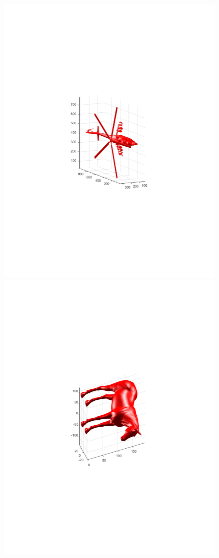 \documentclass{UCF_ETD}
\begin{document}
\begin{figure}[H]
\begin{center}
\includegraphics[scale=0.4]{RobustRegistration/Helicopter}
\includegraphics[scale=0.4]{RobustRegistration/Horse}

\end{center}
\end{figure}
\end{document}
